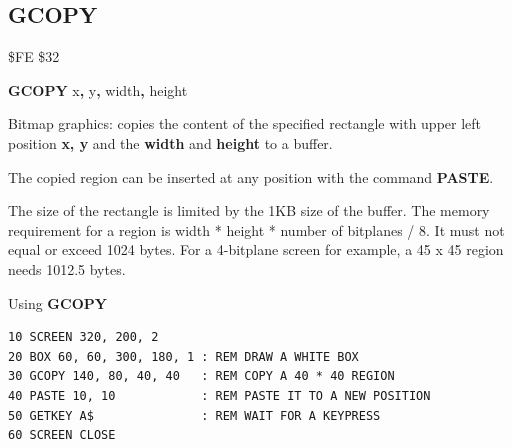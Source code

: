 
\newpage
\subsection{GCOPY}
\begin{description}[leftmargin=2cm,style=nextline]
\item [Token:]    \$FE \$32

\item [Format:]   {\bf GCOPY} x{\bf,} y{\bf,} width{\bf,} height

\item [Usage:]    Bitmap graphics: copies the content of the specified rectangle with upper left position {\bf x, y} and the {\bf width} and {\bf height} to a buffer.

                  The copied region can be inserted at any position with the command {\bf PASTE}.

\item [Remarks:]  The size of the rectangle is limited by the 1KB size of the buffer. The memory requirement for a region is width * height * number of bitplanes / 8. It must not equal or exceed 1024 bytes. For a 4-bitplane screen for example, a 45 x 45 region needs 1012.5 bytes.

\item [Example:]  Using {\bf GCOPY}

\begin{tcolorbox}[colback=black,coltext=white]
\verbatimfont{\codefont}
\begin{verbatim}
10 SCREEN 320, 200, 2
20 BOX 60, 60, 300, 180, 1 : REM DRAW A WHITE BOX
30 GCOPY 140, 80, 40, 40   : REM COPY A 40 * 40 REGION
40 PASTE 10, 10            : REM PASTE IT TO A NEW POSITION
50 GETKEY A$               : REM WAIT FOR A KEYPRESS
60 SCREEN CLOSE
\end{verbatim}
\end{tcolorbox}
\end{description}


\newpage
